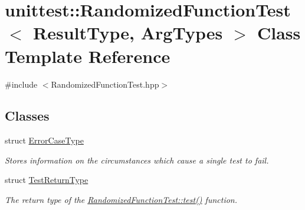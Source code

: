 \hypertarget{classunittest_1_1_randomized_function_test}{}\section{unittest\+:\+:Randomized\+Function\+Test$<$ Result\+Type, Arg\+Types $>$ Class Template Reference}
\label{classunittest_1_1_randomized_function_test}


{\ttfamily \#include $<$Randomized\+Function\+Test.\+hpp$>$}

\subsection*{Classes}
\begin{DoxyCompactItemize}
\item 
struct \hyperlink{structunittest_1_1_randomized_function_test_1_1_error_case_type}{Error\+Case\+Type}
\begin{DoxyCompactList}\small\item\em Stores information on the circumstances which cause a single test to fail. \end{DoxyCompactList}\item 
struct \hyperlink{structunittest_1_1_randomized_function_test_1_1_test_return_type}{Test\+Return\+Type}
\begin{DoxyCompactList}\small\item\em The return type of the \hyperlink{classunittest_1_1_randomized_function_test_a7e4f4b28b4487e4cdd445faf4f4b0ca5}{Randomized\+Function\+Test\+::test()} function. \end{DoxyCompactList}\end{DoxyCompactItemize}
